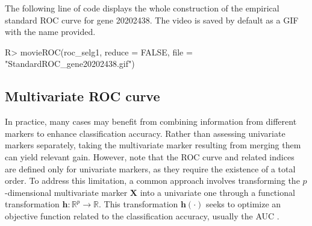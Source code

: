 



\noindent The following line of code displays the whole construction of the empirical standard ROC curve for gene 20202438. The video is saved by default as a GIF with the name provided.
\begin{example}
R> movieROC(roc_selg1, reduce = FALSE, file = "StandardROC_gene20202438.gif")
\end{example}





\subsection{Multivariate ROC curve} \label{section:multiroc}

In practice, many cases may benefit from combining information from different markers to enhance classification accuracy. Rather than assessing univariate markers separately, taking the multivariate marker resulting from merging them can yield relevant gain. However, note that the ROC curve and related indices are defined only for univariate markers, as they require the existence of a total order. To address this limitation, a common approach involves transforming the $p$-dimensional multivariate marker $\boldsymbol{X}$ into a univariate one through a functional transformation $\boldsymbol{h}: \mathbb{R}^p \longrightarrow \mathbb{R}$. This transformation $\boldsymbol{h}(\cdot)$ seeks to optimize an objective function related to the  classification accuracy, usually the AUC \citep{Su1993, McIntosh2002, Camblor2019a}.


